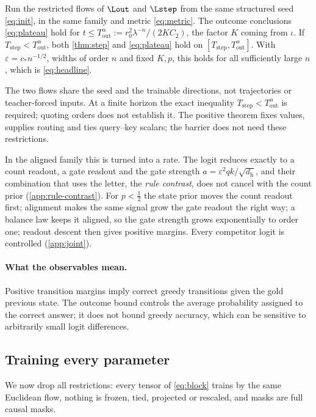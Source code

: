 \begin{corollary}\label{cor:matched}\label{thm:matched}
Run the restricted flows of $\Lout$ and $\Lstep$ from the same structured seed \cref{eq:init}, in the same family and metric \cref{eq:metric}. The outcome conclusions \cref{eq:plateau} hold for $t\le T_{\mathrm{out}}^\alpha:=r_0^2\lambda^{-n}/(2KC_2)$, the factor $K$ coming from $\iota$. If $T_{\mathrm{step}}<T_{\mathrm{out}}^\alpha$, both \cref{thm:step} and \cref{eq:plateau} hold on $[T_{\mathrm{step}},T_{\mathrm{out}}^\alpha]$. With $\varepsilon=c_*n^{-1/2}$, widths of order $n$ and fixed $K,p$, this holds for all sufficiently large $n$, which is \cref{eq:headline}.
\end{corollary}
The two flows share the seed and the trainable directions, not trajectories or teacher-forced inputs. At a finite horizon the exact inequality $T_{\mathrm{step}}<T_{\mathrm{out}}^\alpha$ is required; quoting orders does not establish it. The positive theorem fixes values, supplies routing and ties query--key scalars; the barrier does not need these restrictions.

In the aligned family this is turned into a rate. The logit reduces exactly to a count readout, a gate readout and the gate strength $a=\varepsilon^2qk/\sqrt{d_{\mathrm h}}$, and their combination that uses the letter, the \emph{rule contrast}, does not cancel with the count prior (\cref{app:rule-contrast}). For $p<\frac12$ the state prior moves the count readout first; alignment makes the same signal grow the gate readout the right way; a balance law keeps it aligned, so the gate strength grows exponentially to order one; readout descent then gives positive margins. Every competitor logit is controlled (\cref{app:joint}).

\paragraph{What the observables mean.}
Positive transition margins imply correct greedy transitions given the gold previous state. The outcome bound controls the average probability assigned to the correct answer; it does not bound greedy accuracy, which can be sensitive to arbitrarily small logit differences.

\subsection{Training every parameter}\label{sec:full}
We now drop all restrictions: every tensor of \cref{eq:block} trains by the same Euclidean flow, nothing is frozen, tied, projected or rescaled, and masks are full causal masks.

